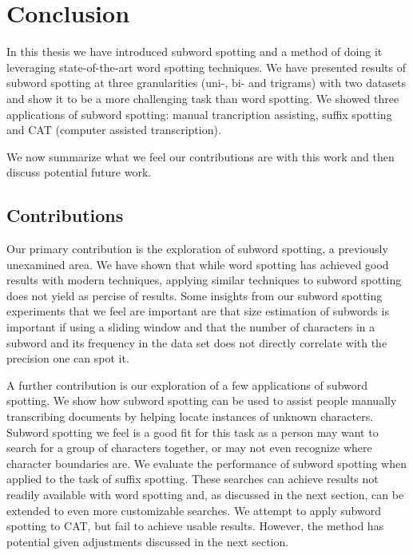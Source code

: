 \documentclass[ms,electronic,twosidetoc,letterpaper,chaptercenter,parttop,lof,lot]{byumsphd}
\begin{document}




\chapter{Conclusion}

In this thesis we have introduced subword spotting and a method of doing it leveraging state-of-the-art word spotting techniques. We have presented results of subword spotting at three granularities (uni-, bi- and trigrams) with two datasets and show it to be a more challenging task than word spotting. We showed three applications of subword spotting: manual trancription assisting, suffix spotting and CAT (computer assisted transcription).

We now summarize what we feel our contributions are with this work and then discuss potential future work.

\section{Contributions}


Our primary contribution is the exploration of subword spotting, a previously unexamined area. We have shown that while word spotting has achieved good results with modern techniques, applying similar techniques to subword spotting does not yield as percise of results.
Some insights from our subword spotting experiments that we feel are important are that 
size estimation of subwords is important if using a sliding window
and that
the number of characters in a subword  and its frequency in the data set does not directly correlate with the precision one can spot it.

A further contribution is our exploration of a few applications of subword spotting.
We show how subword spotting can be used to assist people manually transcribing documents by helping locate instances of unknown characters. Subword spotting we feel is a good fit for this task as a person may want to search for a group of characters together, or may not even recognize where character boundaries are.
We evaluate the performance of subword spotting when applied to the task of suffix spotting. 
These searches can achieve results not readily available with word spotting and, as discussed in the next section, can be extended to even more customizable searches.
We attempt to apply subword spotting to CAT, but fail to achieve usable results. However, the method has potential given adjustments discussed in the next section.
\end{document}
